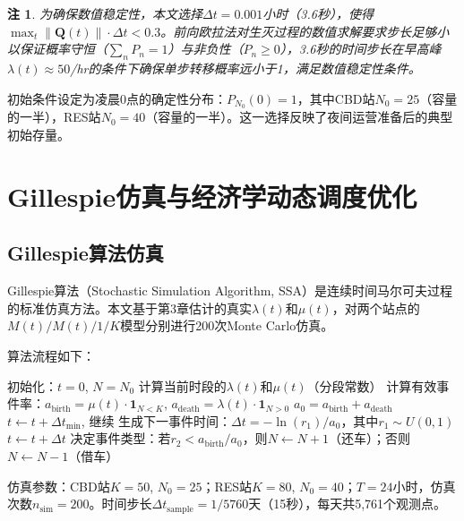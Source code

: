 \documentclass[12pt,a4paper]{article}
\newtheorem{remark}{注}
\begin{document}
\begin{remark}
为确保数值稳定性，本文选择$\Delta t = 0.001$小时（3.6秒），使得$\max_t \|\mathbf{Q}(t)\| \cdot \Delta t < 0.3$。前向欧拉法对生灭过程的数值求解要求步长足够小以保证概率守恒（$\sum_n P_n = 1$）与非负性（$P_n \ge 0$），3.6秒的时间步长在早高峰$\lambda(t) \approx 50$/hr的条件下确保单步转移概率远小于1，满足数值稳定性条件。
\end{remark}

初始条件设定为凌晨0点的确定性分布：$P_{N_0}(0) = 1$，其中CBD站$N_0 = 25$（容量的一半），RES站$N_0 = 40$（容量的一半）。这一选择反映了夜间运营准备后的典型初始存量。

\section{Gillespie仿真与经济学动态调度优化}

\subsection{Gillespie算法仿真}

Gillespie算法\cite{gillespie1977}（Stochastic Simulation Algorithm, SSA）是连续时间马尔可夫过程的标准仿真方法。本文基于第3章估计的真实$\lambda(t)$和$\mu(t)$，对两个站点的$M(t)/M(t)/1/K$模型分别进行200次Monte Carlo仿真。

算法流程如下：
\begin{algorithm}[H]
\caption{Gillespie算法仿真$M(t)/M(t)/1/K$}
\begin{algorithmic}[1]
\STATE 初始化：$t=0$, $N=N_0$
    \STATE 计算当前时段的$\lambda(t)$和$\mu(t)$（分段常数）
    \STATE 计算有效事件率：$a_{\text{birth}} = \mu(t) \cdot \mathbf{1}_{N<K}$, $a_{\text{death}} = \lambda(t) \cdot \mathbf{1}_{N>0}$
    \STATE $a_0 = a_{\text{birth}} + a_{\text{death}}$
        \STATE $t \leftarrow t + \Delta t_{\min}$, 继续
    \ENDIF
    \STATE 生成下一事件时间：$\Delta t = -\ln(r_1)/a_0$，其中$r_1 \sim U(0,1)$
    \STATE $t \leftarrow t + \Delta t$
    \STATE 决定事件类型：若$r_2 < a_{\text{birth}}/a_0$，则$N \leftarrow N+1$（还车）；否则$N \leftarrow N-1$（借车）
\ENDWHILE
\end{algorithmic}
\end{algorithm}

仿真参数：CBD站$K=50$, $N_0=25$；RES站$K=80$, $N_0=40$；$T=24$小时，仿真次数$n_{\text{sim}}=200$。时间步长$\Delta t_{\text{sample}} = 1/5760$天（15秒），每天共5,761个观测点。
\end{document}
